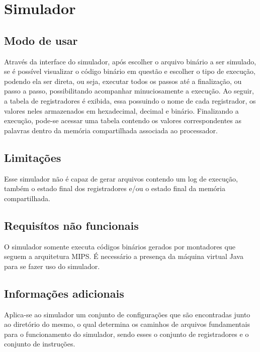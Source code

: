 \documentclass{report}
\begin{document}
    
   \section{Simulador}
     \subsection{Modo de usar}
     Através da interface do simulador, após escolher o arquivo binário a ser simulado, se é possível visualizar o código binário em questão e escolher o tipo de execução, podendo ela ser direta, ou seja, executar todos os passos até a finalização, ou passo a passo, possibilitando acompanhar minuciosamente a execução. Ao seguir, a tabela de registradores é exibida, essa possuindo o nome de cada registrador, os valores neles armazenados em hexadecimal, decimal e binário.
     Finalizando a execução, pode-se acessar uma tabela contendo os valores correspondentes as palavras dentro da memória compartilhada associada ao processador.
     \subsection{Limitações}
     Esse simulador não é capaz de gerar arquivos contendo um log de execução, também o estado final dos registradores e/ou o estado final da memória compartilhada.
	
     \subsection{Requisítos não funcionais}
     O simulador somente executa códigos binários gerados por montadores que seguem a arquitetura MIPS. É necessário a presença da máquina virtual Java para se fazer uso do simulador. 
     
     \subsection{Informações adicionais}
     Aplica-se ao simulador um conjunto de configurações que são encontradas junto ao diretório do mesmo, o qual determina os caminhos de arquivos fundamentais para o funcionamento do simulador, sendo esses o conjunto de registradores e o conjunto de instruções.

% 
% 
\end{document}
